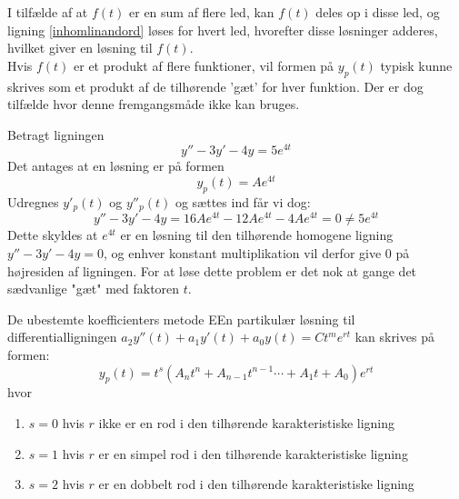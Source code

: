 I tilfælde af at $f(t)$ er en sum af flere led, kan $f(t)$ deles op i disse led, og ligning \ref{inhomlinandord} løses for hvert led, hvorefter disse løsninger adderes, hvilket giver en løsning til $f(t)$. \\
Hvis $f(t)$ er et produkt af flere funktioner, vil formen på $y_p(t)$ typisk kunne skrives som et produkt af de tilhørende 'gæt' for hver funktion.
Der er dog tilfælde hvor denne fremgangsmåde ikke kan bruges.

\begin{Example}\hfill \break
\textnormal{Betragt ligningen} $$y'' -3y'-4y=5e^{4t}$$ \textnormal{Det antages at en løsning er på formen} $$y_p(t)=Ae^{4t}$$ \textnormal{Udregnes $y'_p(t)$ og $y''_p(t)$ og sættes ind får vi dog:}
$$y'' -3y'-4y=16Ae^{4t}-12Ae^{4t}-4Ae^{4t}=0  \neq 5e^{4t}$$
\textnormal{Dette skyldes at $e^{4t}$ er en løsning til den tilhørende homogene ligning $y'' -3y'-4y=0$, og enhver konstant multiplikation vil derfor give 0 på højresiden af ligningen. For at løse dette problem er det nok at gange det sædvanlige "gæt" med faktoren $t$.}
\end{Example}

\hfill \break
\begin{prop}{De ubestemte koefficienters metode}
EEn partikulær løsning til differentialligningen $a_2y''(t)+a_1y'(t)+a_0y(t)=Ct^me^{rt}$ kan skrives på formen: 
$$y_p(t)= t^s(A_nt^n+A_{n-1}t^{n-1}  \cdots +A_1t+A_0)e^{rt}$$ 
hvor 
\begin{enumerate}
    \item $s=0$ hvis $r$ ikke er en rod i den tilhørende karakteristiske ligning
    \item $s=1$ hvis $r$ er en simpel rod i den tilhørende karakteristiske ligning
    \item $s=2$ hvis $r$ er en dobbelt rod i den tilhørende karakteristiske ligning
\end{enumerate}
\end{prop}
\hfill \break


